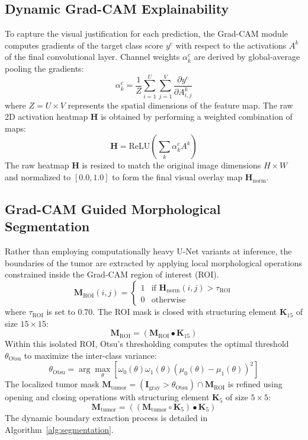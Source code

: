 \documentclass[journal,twoside]{IEEEtran}
\begin{document}
\subsection{Dynamic Grad-CAM Explainability}
To capture the visual justification for each prediction, the Grad-CAM module computes gradients of the target class score $y^c$ with respect to the activations $A^k$ of the final convolutional layer. Channel weights $\alpha_k^c$ are derived by global-average pooling the gradients:
\begin{equation}
\alpha_k^c = \frac{1}{Z} \sum_{i=1}^{U} \sum_{j=1}^{V} \frac{\partial y^c}{\partial A_{i,j}^k}
\end{equation}
where $Z = U \times V$ represents the spatial dimensions of the feature map. The raw 2D activation heatmap $\mathbf{H}$ is obtained by performing a weighted combination of maps:
\begin{equation}
\mathbf{H} = \text{ReLU}\left(\sum_{k} \alpha_k^c A^k\right)
\end{equation}
The raw heatmap $\mathbf{H}$ is resized to match the original image dimensions $H \times W$ and normalized to $[0.0, 1.0]$ to form the final visual overlay map $\mathbf{H}_{\text{norm}}$.

\subsection{Grad-CAM Guided Morphological Segmentation}
Rather than employing computationally heavy U-Net variants at inference, the boundaries of the tumor are extracted by applying local morphological operations constrained inside the Grad-CAM region of interest (ROI).
\begin{equation}
\mathbf{M}_\text{ROI}(i,j) = \begin{cases} 
      1 & \text{if } \mathbf{H}_{\text{norm}}(i,j) > \tau_{\text{ROI}} \\
      0 & \text{otherwise}
   \end{cases}
\end{equation}
where $\tau_{\text{ROI}}$ is set to $0.70$. The ROI mask is closed with structuring element $\mathbf{K}_{15}$ of size $15 \times 15$:
\begin{equation}
\mathbf{M}_\text{ROI} = (\mathbf{M}_\text{ROI} \bullet \mathbf{K}_{15})
\end{equation}
Within this isolated ROI, Otsu's thresholding computes the optimal threshold $\theta_{\text{Otsu}}$ to maximize the inter-class variance:
\begin{equation}
\theta_{\text{Otsu}} = \arg\max_\theta \left[ \omega_0(\theta)\omega_1(\theta) (\mu_0(\theta) - \mu_1(\theta))^2 \right]
\end{equation}
The localized tumor mask $\mathbf{M}_{\text{tumor}} = (\mathbf{I}_{\text{gray}} > \theta_{\text{Otsu}}) \cap \mathbf{M}_\text{ROI}$ is refined using opening and closing operations with structuring element $\mathbf{K}_5$ of size $5 \times 5$:
\begin{equation}
\mathbf{M}_{\text{tumor}} = ((\mathbf{M}_{\text{tumor}} \circ \mathbf{K}_5) \bullet \mathbf{K}_5)
\end{equation}
The dynamic boundary extraction process is detailed in Algorithm~\ref{alg:segmentation}.
\end{document}
